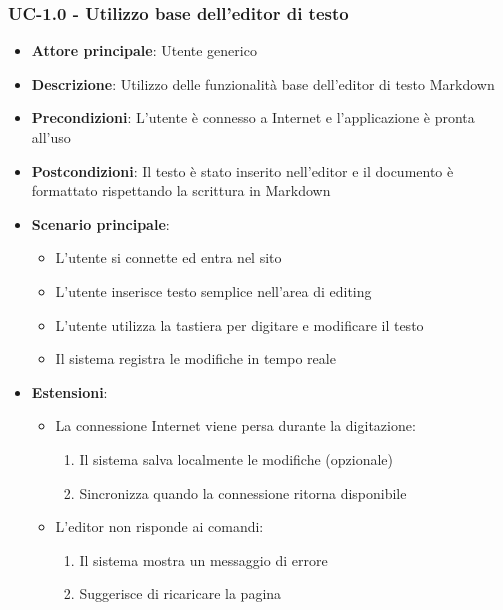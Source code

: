 \documentclass[11pt,a4paper]{article}
\begin{document}
\subsubsection{UC-1.0 - Utilizzo base dell'editor di testo}
\begin{itemize}
    \item \textbf{Attore principale}: Utente generico
    \item \textbf{Descrizione}: Utilizzo delle funzionalità base dell'editor di testo Markdown
    \item \textbf{Precondizioni}: L'utente è connesso a Internet e l'applicazione è pronta all'uso
    \item \textbf{Postcondizioni}: Il testo è stato inserito nell'editor e il documento è formattato rispettando la scrittura in Markdown
    \item \textbf{Scenario principale}:
        \begin{itemize}
            \item L'utente si connette ed entra nel sito
            \item L'utente inserisce testo semplice nell'area di editing
            \item L'utente utilizza la tastiera per digitare e modificare il testo
            \item Il sistema registra le modifiche in tempo reale
        \end{itemize}
    \item \textbf{Estensioni}:
        \begin{itemize}
            \item La connessione Internet viene persa durante la digitazione:
                \begin{enumerate}
                    \item Il sistema salva localmente le modifiche (opzionale)
                    \item Sincronizza quando la connessione ritorna disponibile
                \end{enumerate}
            \item L'editor non risponde ai comandi:
                \begin{enumerate}
                    \item Il sistema mostra un messaggio di errore
                    \item Suggerisce di ricaricare la pagina
                \end{enumerate}
        \end{itemize}
\end{itemize}
\end{document}
